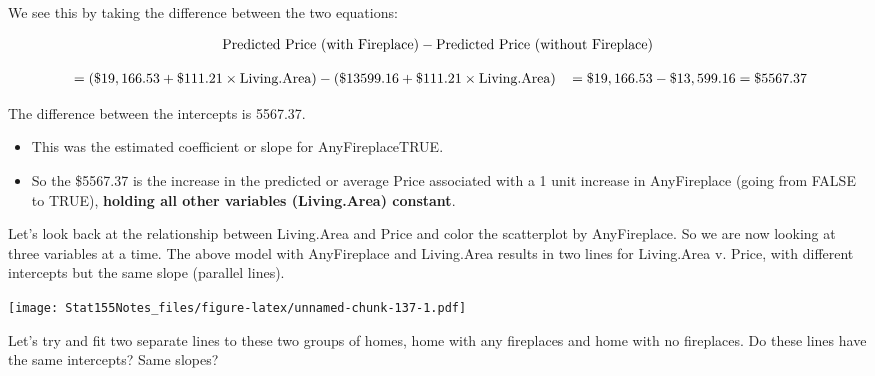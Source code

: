 \documentclass[]{book}
\newenvironment{Shaded}{\begin{snugshade}}{\end{snugshade}}
\newcommand{\DataTypeTok}[1]{\textcolor[rgb]{0.13,0.29,0.53}{#1}}
\newcommand{\KeywordTok}[1]{\textcolor[rgb]{0.13,0.29,0.53}{\textbf{#1}}}
\newcommand{\NormalTok}[1]{#1}
\newcommand{\OperatorTok}[1]{\textcolor[rgb]{0.81,0.36,0.00}{\textbf{#1}}}
\newcommand{\OtherTok}[1]{\textcolor[rgb]{0.56,0.35,0.01}{#1}}
\newcommand{\StringTok}[1]{\textcolor[rgb]{0.31,0.60,0.02}{#1}}
\begin{document}
We see this by taking the difference between the two equations:

\[ \hbox{Predicted Price (with Fireplace)} - \hbox{Predicted Price (without Fireplace)} \]

\[
\begin{align*}
\,&= (\$19,166.53 + \$111.21 \times \hbox{Living.Area}) - ( \$13599.16 + \$111.21 \times \hbox{Living.Area})
\,&= \$19,166.53 - \$13,599.16 = \$5567.37
\end{align*}
\]

The difference between the intercepts is 5567.37.

\begin{itemize}
\item
  This was the estimated coefficient or slope for AnyFireplaceTRUE.
\item
  So the \$5567.37 is the increase in the predicted or average Price associated with a 1 unit increase in AnyFireplace (going from FALSE to TRUE), \textbf{holding all other variables (Living.Area) constant}.
\end{itemize}

Let's look back at the relationship between Living.Area and Price and color the scatterplot by AnyFireplace. So we are now looking at three variables at a time. The above model with AnyFireplace and Living.Area results in two lines for Living.Area v. Price, with different intercepts but the same slope (parallel lines).

\begin{Shaded}
\end{Shaded}

\texttt{[image: Stat155Notes\_files/figure-latex/unnamed-chunk-137-1.pdf]}

Let's try and fit two separate lines to these two groups of homes, home with any fireplaces and home with no fireplaces. Do these lines have the same intercepts? Same slopes?

\begin{Shaded}
\end{Shaded}
\end{document}
